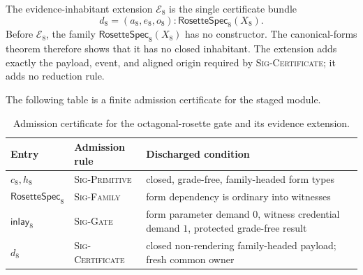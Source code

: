 \documentclass[11pt]{article}
\numberwithin{equation}{section}
\theoremstyle{definition}
\theoremstyle{plain}
\theoremstyle{remark}
\begin{document}
The evidence-inhabitant extension \(\mathcal E_8\) is the single certificate
bundle
\[
 d_8=(a_8,e_8,o_8):\mathsf{RosetteSpec}_8(X_8).
\]
Before \(\mathcal E_8\), the family
\(\mathsf{RosetteSpec}_8(X_8)\) has no constructor.  The canonical-forms
theorem therefore shows that it has no closed inhabitant.  The extension adds
exactly the payload, event, and aligned origin required by
\textsc{Sig-Certificate}; it adds no reduction rule.

The following table is a finite admission certificate for the staged module.
\begin{table}[ht]
\centering
\small
\begin{tabularx}{\textwidth}{@{}l>{\raggedright\arraybackslash}p{}X@{}}
\toprule
Entry & Admission rule & Discharged condition\\
\midrule
\(c_8,h_8\) & \textsc{Sig-Primitive} & closed, grade-free,
family-headed form types\\
\(\mathsf{RosetteSpec}_8\) & \textsc{Sig-Family} & form dependency is
ordinary into witnesses\\
\(\mathsf{inlay}_8\) & \textsc{Sig-Gate} & form parameter demand \(0\),
witness credential demand \(1\), protected grade-free result\\
\(d_8\) & \textsc{Sig-Certificate} & closed non-rendering family-headed
payload; fresh common owner\\
\bottomrule
\end{tabularx}
\caption{Admission certificate for the octagonal-rosette gate and its
evidence extension.}
\label{tab:rosette-certificate}
\end{table}
\end{document}
